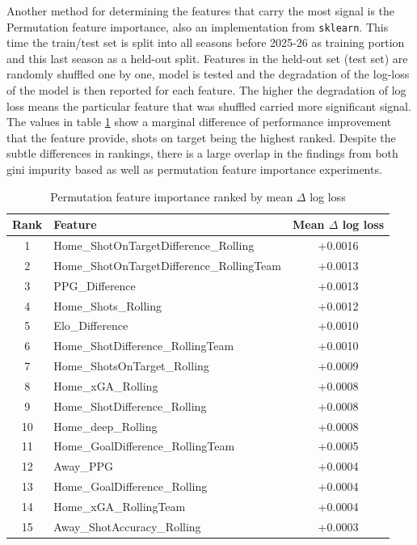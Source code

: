 \documentclass{article}
\begin{document}
Another method for determining the features that carry the most signal is the Permutation feature importance, also an implementation from \texttt{sklearn}. This time the train/test set is split into all seasons before 2025-26 as training portion and this last season as a held-out split. Features in the held-out set (test set) are randomly shuffled one by one, model is tested and the degradation of the log-loss of the model is then reported for each feature. The higher the degradation of log loss means the particular feature that was shuffled carried more significant signal. The values in table \ref{tab:permutation_importance} show a marginal difference of performance improvement that the feature provide, shots on target being the highest ranked. Despite the subtle differences in rankings, there is a large overlap in the findings from both gini impurity based as well as permutation feature importance experiments.


\begin{table}[H]
\centering
\begin{tabular}{@{} c l c @{}}
\toprule
\textbf{Rank} & \textbf{Feature} & \textbf{Mean $\Delta$ log loss} \\
\midrule
1  & Home\_ShotOnTargetDifference\_Rolling     & +0.0016 \\
2  & Home\_ShotOnTargetDifference\_RollingTeam & +0.0013 \\
3  & PPG\_Difference                             & +0.0013 \\
4  & Home\_Shots\_Rolling                       & +0.0012 \\
5  & Elo\_Difference                             & +0.0010 \\
6  & Home\_ShotDifference\_RollingTeam          & +0.0010 \\
7  & Home\_ShotsOnTarget\_Rolling                & +0.0009 \\
8  & Home\_xGA\_Rolling                         & +0.0008 \\
9  & Home\_ShotDifference\_Rolling               & +0.0008 \\
10 & Home\_deep\_Rolling                         & +0.0008 \\
11 & Home\_GoalDifference\_RollingTeam           & +0.0005 \\
12 & Away\_PPG                                    & +0.0004 \\
13 & Home\_GoalDifference\_Rolling                & +0.0004 \\
14 & Home\_xGA\_RollingTeam                      & +0.0004 \\
15 & Away\_ShotAccuracy\_Rolling                  & +0.0003 \\
\bottomrule
\end{tabular}
\caption{Permutation feature importance ranked by mean $\Delta$ log loss}
\label{tab:permutation_importance}
\end{table}
\end{document}
